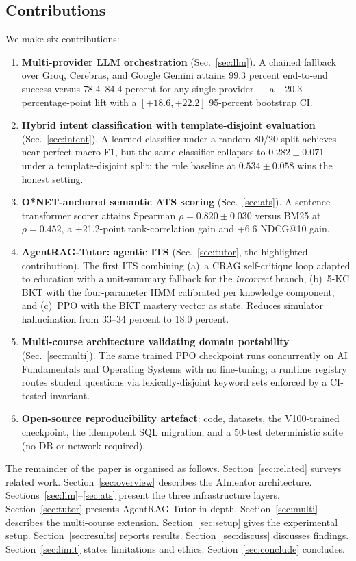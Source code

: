 \documentclass[conference]{IEEEtran}
\begin{document}
\subsection{Contributions}\label{sec:contrib}
We make six contributions:
\begin{enumerate}
\item \textbf{Multi-provider LLM orchestration} (Sec.~\ref{sec:llm}).
A chained fallback over Groq, Cerebras, and Google Gemini attains
99.3 percent end-to-end success versus 78.4--84.4 percent for any
single provider --- a +20.3 percentage-point lift with a
$[+18.6, +22.2]$ 95-percent bootstrap CI.
\item \textbf{Hybrid intent classification with template-disjoint
evaluation} (Sec.~\ref{sec:intent}). A learned classifier under a
random 80/20 split achieves near-perfect macro-F1, but the same
classifier collapses to $0.282\pm0.071$ under a template-disjoint
split; the rule baseline at $0.534\pm0.058$ wins the honest setting.
\item \textbf{O*NET-anchored semantic ATS scoring}
(Sec.~\ref{sec:ats}). A sentence-transformer scorer attains Spearman
$\rho=0.820\pm0.030$ versus BM25 at $\rho=0.452$, a +21.2-point
rank-correlation gain and +6.6 NDCG@10 gain.
\item \textbf{AgentRAG-Tutor: agentic ITS} (Sec.~\ref{sec:tutor}, the
highlighted contribution). The first ITS combining (a)~a CRAG
self-critique loop adapted to education with a unit-summary fallback
for the \emph{incorrect} branch, (b)~5-KC BKT with the four-parameter
HMM calibrated per knowledge component, and (c)~PPO with the BKT
mastery vector as state. Reduces simulator hallucination from 33--34
percent to 18.0 percent.
\item \textbf{Multi-course architecture validating domain
portability} (Sec.~\ref{sec:multi}). The same trained PPO checkpoint
runs concurrently on AI Fundamentals and Operating Systems with no
fine-tuning; a runtime registry routes student questions via
lexically-disjoint keyword sets enforced by a CI-tested invariant.
\item \textbf{Open-source reproducibility artefact}: code, datasets,
the V100-trained checkpoint, the idempotent SQL migration, and a
50-test deterministic suite (no DB or network required).
\end{enumerate}

The remainder of the paper is organised as follows.
Section~\ref{sec:related} surveys related work.
Section~\ref{sec:overview} describes the AImentor architecture.
Sections~\ref{sec:llm}--\ref{sec:ats} present the three infrastructure
layers. Section~\ref{sec:tutor} presents AgentRAG-Tutor in depth.
Section~\ref{sec:multi} describes the multi-course extension.
Section~\ref{sec:setup} gives the experimental setup.
Section~\ref{sec:results} reports results.
Section~\ref{sec:discuss} discusses findings.
Section~\ref{sec:limit} states limitations and ethics.
Section~\ref{sec:conclude} concludes.
\end{document}
